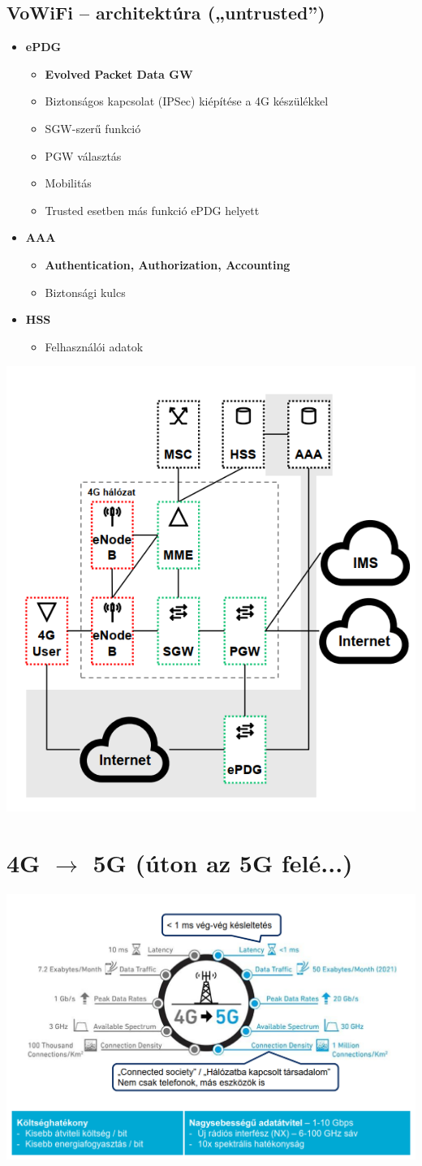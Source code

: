 \documentclass[10pt,a4paper]{article}
\begin{document}
\subsection{VoWiFi – architektúra („untrusted”)}
	\begin{itemize}
	\item \textbf{ePDG}
		\begin{itemize}
		\item  \textbf{Evolved Packet Data GW}
		\item  Biztonságos kapcsolat (IPSec) kiépítése a 4G készülékkel
		\item  SGW-szerű funkció
		\item  PGW választás
		\item  Mobilitás
		\item  Trusted esetben más funkció ePDG helyett
		\end{itemize}
	\item  \textbf{AAA}
		\begin{itemize}
		 \item  \textbf{Authentication, Authorization, Accounting}
		 \item Biztonsági kulcs
		\end{itemize}
	\item  \textbf{HSS}
		\begin{itemize}
		\item  Felhasználói adatok
		\end{itemize}
	\end{itemize}
\begin{center}
	\includegraphics[width=0.42\linewidth]{src/VoWifiarch}
\end{center}
\section{4G $\rightarrow$ 5G (úton az 5G felé...)}
\begin{center}
	\includegraphics[width=0.7\linewidth]{src/4-5g}
\end{center}
\end{document}

